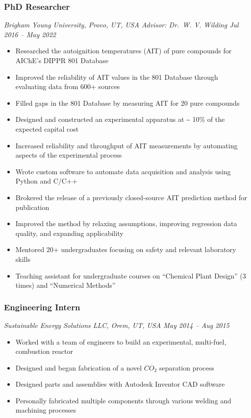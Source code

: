 \subsubsection{PhD Researcher}\label{phd-researcher}

\emph{Brigham Young University, Provo, UT, USA \textbar{} Advisor:
Dr.~W. V. Wilding \textbar{} Jul 2016 -- May 2022}

\begin{itemize}
\tightlist
\item
  Researched the autoignition temperatures (AIT) of pure compounds for
  AIChE's DIPPR 801 Database
\item
  Improved the reliability of AIT values in the 801 Database through
  evaluating data from 600+ sources
\item
  Filled gaps in the 801 Database by measuring AIT for 20 pure compounds
\item
  Designed and constructed an experimental apparatus at
  \textasciitilde{} 10\% of the expected capital cost
\item
  Increased reliability and throughput of AIT measurements by automating
  aspects of the experimental process
\item
  Wrote custom software to automate data acquisition and analysis using
  Python and C/C++
\item
  Brokered the release of a previously closed-source AIT prediction
  method for publication
\item
  Improved the method by relaxing assumptions, improving regression data
  quality, and expanding applicability
\item
  Mentored 20+ undergraduates focusing on safety and relevant laboratory
  skills
\item
  Teaching assistant for undergraduate courses on ``Chemical Plant
  Design'' (3 times) and ``Numerical Methods''
\end{itemize}

\subsubsection{Engineering Intern}\label{engineering-intern}

\emph{Sustainable Energy Solutions LLC, Orem, UT, USA \textbar{} May
2014 -- Aug 2015}

\begin{itemize}
\tightlist
\item
  Worked with a team of engineers to build an experimental, multi-fuel,
  combustion reactor
\item
  Designed and began fabrication of a novel \(CO_2\)\hspace{0pt}
  separation process
\item
  Designed parts and assemblies with Autodesk Inventor CAD software
\item
  Personally fabricated multiple components through various welding and
  machining processes
\end{itemize}


